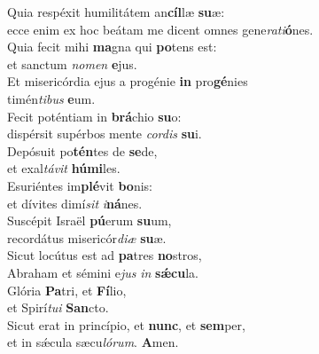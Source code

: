 \oddverse Quia respéxit humilitátem an\textbf{cíl}læ \textbf{su}æ:~\*\\
\oddverse ecce enim ex hoc beátam me dicent omnes gene\textit{ra}\textit{ti}\textbf{ó}nes.\\
\evenverse Quia fecit mihi \textbf{ma}gna qui \textbf{po}tens est:~\*\\
\evenverse et sanctum \textit{no}\textit{men} \textbf{e}jus.\\
\oddverse Et misericórdia ejus a progénie \textbf{in} pro\textbf{gé}nies~\*\\
\oddverse timén\textit{ti}\textit{bus} \textbf{e}um.\\
\evenverse Fecit poténtiam in \textbf{brá}chio \textbf{su}o:~\*\\
\evenverse dispérsit supérbos mente \textit{cor}\textit{dis} \textbf{su}i.\\
\oddverse Depósuit po\textbf{tén}tes de \textbf{se}de,~\*\\
\oddverse et exal\textit{tá}\textit{vit} \textbf{hú}\textbf{mi}les.\\
\evenverse Esuriéntes im\textbf{plé}vit \textbf{bo}nis:~\*\\
\evenverse et dívites dimí\textit{sit} \textit{i}\textbf{ná}nes.\\
\oddverse Suscépit Israël \textbf{pú}erum \textbf{su}um,~\*\\
\oddverse recordátus misericór\textit{di}\textit{æ} \textbf{su}æ.\\
\evenverse Sicut locútus est ad \textbf{pa}tres \textbf{no}stros,~\*\\
\evenverse Abraham et sémini e\textit{jus} \textit{in} \textbf{sǽ}\textbf{cu}la.\\
\oddverse Glória \textbf{Pa}tri, et \textbf{Fí}lio,~\*\\
\oddverse et Spirí\textit{tu}\textit{i} \textbf{San}cto.\\
\evenverse Sicut erat in princípio, et \textbf{nunc}, et \textbf{sem}per,~\*\\
\evenverse et in sǽcula sæcu\textit{ló}\textit{rum}. \textbf{A}men.\\

